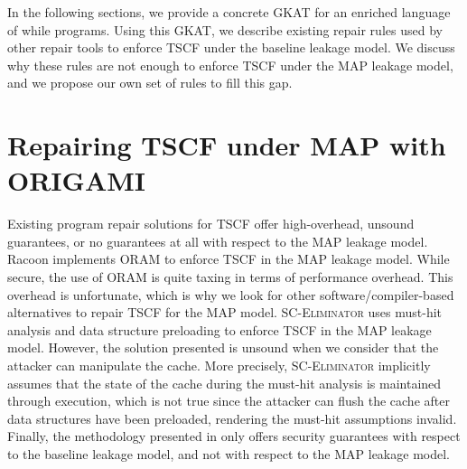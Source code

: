 In the following sections, we provide a concrete GKAT for an enriched language of while programs. Using this GKAT, we describe existing repair rules used by other repair tools to enforce TSCF under the baseline leakage model. We discuss why these rules are not enough to enforce TSCF under the MAP leakage model, and we propose our own set of rules to fill this gap.



\section{Repairing TSCF under MAP with ORIGAMI}
\label{sec:ORIGAMI}
Existing program repair solutions for TSCF \cite{Racoon,SCEliminator,MSESC} offer high-overhead, unsound guarantees, or no guarantees at all with respect to the MAP leakage model. Racoon \cite{Racoon} implements ORAM to enforce TSCF in the MAP leakage model. While secure, the use of ORAM is quite taxing in terms of performance overhead. This overhead is unfortunate, which is why we look for other software/compiler-based alternatives to repair TSCF for the MAP model. \textsc{SC-Eliminator} \cite{SCEliminator} uses must-hit analysis and data structure preloading to enforce TSCF in the MAP leakage model. However, the solution presented is unsound when we consider that the attacker can manipulate the cache. More precisely, \textsc{SC-Eliminator} implicitly assumes that the state of the cache during the must-hit analysis is maintained through execution, which is not true since the attacker can flush the cache after data structures have been preloaded, rendering the must-hit assumptions invalid. Finally, the methodology presented in \cite{MSESC} only offers security guarantees with respect to the baseline leakage model, and not with respect to the MAP leakage model.

